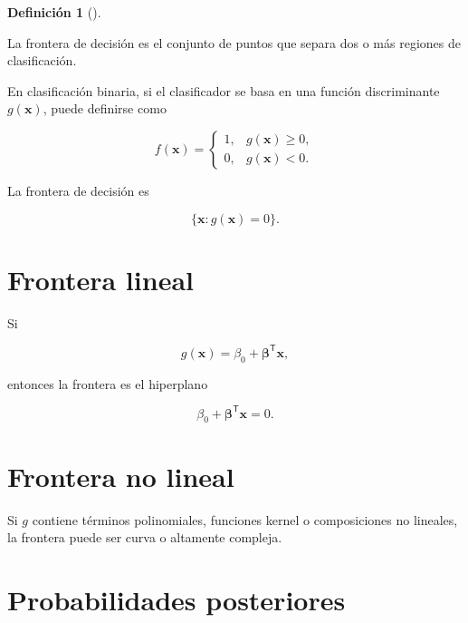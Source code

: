 \documentclass[
  spanish,
  10.5pt,
  letterpaper,
  DIV=11,
  numbers=noendperiod,
  oneside,
  open=any]{scrreprt}
\theoremstyle{definition}
\newtheorem{definition}{Definición}[chapter]
\theoremstyle{definition}
\theoremstyle{plain}
\theoremstyle{remark}
\begin{document}
\begin{definition}[]\protect\hypertarget{def-frontera-decision}{}\label{def-frontera-decision}

La frontera de decisión es el conjunto de puntos que separa dos o más
regiones de clasificación.

\end{definition}

En clasificación binaria, si el clasificador se basa en una función
discriminante \(g(\mathbf{x})\), puede definirse como

\[
f(\mathbf{x})
=
\begin{cases}
1, & g(\mathbf{x})\geq 0,\\
0, & g(\mathbf{x})<0.
\end{cases}
\]

La frontera de decisión es

\[
\{
\mathbf{x}:g(\mathbf{x})=0
\}.
\]

\section*{Frontera lineal}\label{frontera-lineal}


Si

\[
g(\mathbf{x})
=
\beta_0
+
\boldsymbol{\beta}^{\mathsf T}\mathbf{x},
\]

entonces la frontera es el hiperplano

\[
\beta_0
+
\boldsymbol{\beta}^{\mathsf T}\mathbf{x}
=
0.
\]

\section*{Frontera no lineal}\label{frontera-no-lineal}


Si \(g\) contiene términos polinomiales, funciones kernel o
composiciones no lineales, la frontera puede ser curva o altamente
compleja.

\section*{Probabilidades posteriores}\label{probabilidades-posteriores}

\end{document}
